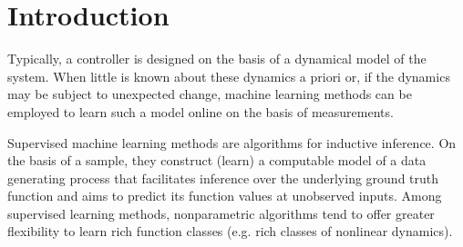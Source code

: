 


\section{Introduction}

Typically, a controller is designed on the basis of a dynamical model of the system. When little is known about these dynamics a priori or, if the dynamics may be subject to unexpected change, machine learning methods can be employed to learn such a model online on the basis of measurements. 

Supervised machine learning methods are algorithms for inductive inference. On the basis of a sample, they construct (learn) a computable model of a data generating process that facilitates inference over the underlying ground truth function and aims to predict its function values at unobserved inputs.
%
Among supervised learning methods, nonparametric algorithms tend to offer greater flexibility to learn rich 
function classes (e.g. rich classes of nonlinear dynamics). 
 
